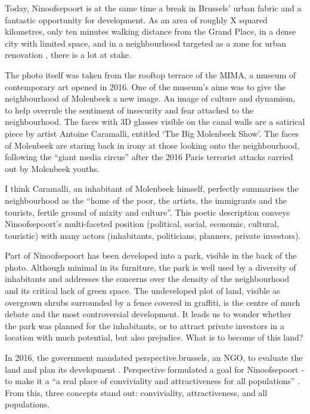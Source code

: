 \documentclass{article}[11pt]
\begin{document}
Today, Ninoofsepoort is at the same time a break in Brussels' urban fabric and a fantastic opportunity for development. As an area of roughly X squared kilometres, only ten minutes walking distance from the Grand Place, in a dense city with limited space, and in a neighbourhood targeted as a zone for urban renovation \parencite{perspective2020zru}, there is a lot at stake.

The photo itself was taken from the rooftop terrace of the MIMA, a museum of contemporary art opened in 2016. One of the museum's aims was to give the neighbourhood of Molenbeek a new image. An image of culture and dynamism, to help overrule the sentiment of insecurity and fear attached to the neighbourhood. The faces with 3D glasses visible on the canal walls are a satirical piece by artist Antoine Caramalli, entitled `The Big Molenbeek Show'. The faces of Molenbeek are staring back in irony at those looking onto the neighbourhood, following the ``giant media circus''\parencite{antoine2016canal} after the 2016 Paris terrorist attacks carried out by Molenbeek youths.

I think Caramalli, an inhabitant of Molenbeek himself, perfectly summarises the neighbourhood as the ``home of the poor, the artists, the immigrants and the tourists, fertile ground of mixity and culture''\parencite{antoine2016canal}.
This poetic description conveys Ninoofsepoort's multi-faceted position (political, social, economic, cultural, touristic) with many actors (inhabitants, politicians, planners, private investors).

Part of Ninoofsepoort has been developed into a park, visible in the back of the photo. Although minimal in its furniture, the park is well used by a diversity of inhabitants and addresses the concerns over the density of the neighbourhood and its critical lack of green space.
The undeveloped plot of land, visible as overgrown shrubs surrounded by a fence covered in graffiti, is the centre of much debate and the most controversial development. It leads us to wonder whether the park was planned for the inhabitants, or to attract private investors in a location with much potential, but also prejudice. What is to become of this land?


In 2016, the government mandated perspective.brussels, an NGO, to evaluate the land and plan its development \parencite{diagnosticNinove}. Perspective formulated a goal for Ninoofsepoort - to make it a ``a real place of conviviality and attractiveness for all populations'' \parencite{perspectiveNinove}. From this, three concepts stand out: conviviality, attractiveness, and all populations.
\end{document}
